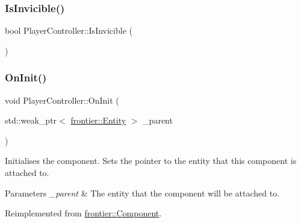 \mbox{\label{class_player_controller_a8cd8a56ee0332aebb447db6a691aa639}} 
\subsubsection{\texorpdfstring{Is\+Invicible()}{IsInvicible()}}
{\footnotesize\ttfamily bool Player\+Controller\+::\+Is\+Invicible (\begin{DoxyParamCaption}{ }\end{DoxyParamCaption})}

\mbox{\label{class_player_controller_a22c60d9e4464ee585f3592593f14bc50}} 
\subsubsection{\texorpdfstring{On\+Init()}{OnInit()}}
{\footnotesize\ttfamily void Player\+Controller\+::\+On\+Init (\begin{DoxyParamCaption}\item[{std\+::weak\+\_\+ptr$<$ \hyperlink{classfrontier_1_1_entity}{frontier\+::\+Entity} $>$}]{\+\_\+parent }\end{DoxyParamCaption})\hspace{0.3cm}{\ttfamily [virtual]}}



Initialises the component. Sets the pointer to the entity that this component is attached to. 


\begin{DoxyParams}{Parameters}
{\em \+\_\+parent} & The entity that the component will be attached to. \\
\hline
\end{DoxyParams}


Reimplemented from \hyperlink{classfrontier_1_1_component_af3da02905c4d79219d9b12f260a35ad1}{frontier\+::\+Component}.

\mbox{\label{class_player_controller_a5641058df338563ff6bb6bce7645ef7b}} 
